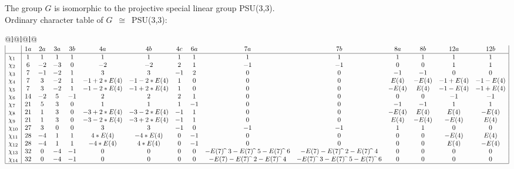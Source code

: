 \documentclass[varwidth=\maxdimen,border=10]{standalone}
\begin{document}
The group $G$ is isomorphic to the projective special linear group PSU(3,3).\\
Ordinary character table of $G$\ $\cong$\ PSU(3,3):\\
\begin{center}
\begin{tabular}{@{}l@{}l@{}l@{}}
\hline
\(\begin{array}{|l|cccccccccccccc|}
  & 1a & 2a & 3a & 3b & 4a & 4b & 4c & 6a & 7a & 7b & 8a & 8b & 12a & 12b\\ \hline
\chi_{1} & 1 & 1 & 1 & 1 & 1 & 1 & 1 & 1 & 1 & 1 & 1 & 1 & 1 & 1\\
\chi_{2} & 6 & -2 & -3 & 0 & -2 & -2 & 2 & 1 & -1 & -1 & 0 & 0 & 1 & 1\\
\chi_{3} & 7 & -1 & -2 & 1 & 3 & 3 & -1 & 2 & 0 & 0 & -1 & -1 & 0 & 0\\
\chi_{4} & 7 & 3 & -2 & 1 & -1+2*E(4) & -1-2*E(4) & 1 & 0 & 0 & 0 & E(4) & -E(4) & -1+E(4) & -1-E(4)\\
\chi_{5} & 7 & 3 & -2 & 1 & -1-2*E(4) & -1+2*E(4) & 1 & 0 & 0 & 0 & -E(4) & E(4) & -1-E(4) & -1+E(4)\\
\chi_{6} & 14 & -2 & 5 & -1 & 2 & 2 & 2 & 1 & 0 & 0 & 0 & 0 & -1 & -1\\
\chi_{7} & 21 & 5 & 3 & 0 & 1 & 1 & 1 & -1 & 0 & 0 & -1 & -1 & 1 & 1\\
\chi_{8} & 21 & 1 & 3 & 0 & -3+2*E(4) & -3-2*E(4) & -1 & 1 & 0 & 0 & -E(4) & E(4) & E(4) & -E(4)\\
\chi_{9} & 21 & 1 & 3 & 0 & -3-2*E(4) & -3+2*E(4) & -1 & 1 & 0 & 0 & E(4) & -E(4) & -E(4) & E(4)\\
\chi_{10} & 27 & 3 & 0 & 0 & 3 & 3 & -1 & 0 & -1 & -1 & 1 & 1 & 0 & 0\\
\chi_{11} & 28 & -4 & 1 & 1 & 4*E(4) & -4*E(4) & 0 & -1 & 0 & 0 & 0 & 0 & -E(4) & E(4)\\
\chi_{12} & 28 & -4 & 1 & 1 & -4*E(4) & 4*E(4) & 0 & -1 & 0 & 0 & 0 & 0 & E(4) & -E(4)\\
\chi_{13} & 32 & 0 & -4 & -1 & 0 & 0 & 0 & 0 & -E(7) \widehat{\ }\ {3}-E(7) \widehat{\ }\ {5}-E(7) \widehat{\ }\ {6} & -E(7)-E(7) \widehat{\ }\ {2}-E(7) \widehat{\ }\ {4} & 0 & 0 & 0 & 0\\
\chi_{14} & 32 & 0 & -4 & -1 & 0 & 0 & 0 & 0 & -E(7)-E(7) \widehat{\ }\ {2}-E(7) \widehat{\ }\ {4} & -E(7) \widehat{\ }\ {3}-E(7) \widehat{\ }\ {5}-E(7) \widehat{\ }\ {6} & 0 & 0 & 0 & 0\\
\hline
\end{array}\)\\
\end{tabular}
\end{center}
\end{document}
